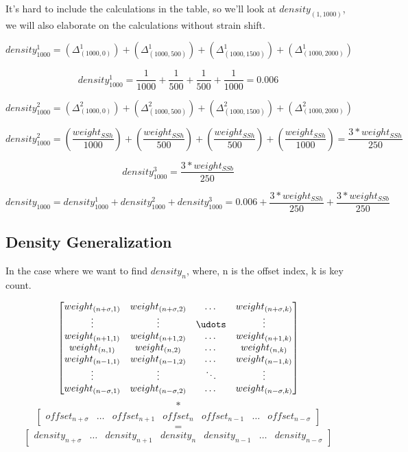 It's hard to include the calculations in the table, so we'll look at $density_{(1,1000)}$, we will also elaborate on the calculations without strain shift.

$$density_{1000}^1 =
(\Delta_{(1000,0)}^{1}) +
(\Delta_{(1000,500)}^{1}) +
(\Delta_{(1000,1500)}^{1}) +
(\Delta_{(1000,2000)}^{1})$$

$$density_{1000}^1 =
\frac{1}{1000} +
\frac{1}{500} +
\frac{1}{500} +
\frac{1}{1000} = 0.006$$

$$density_{1000}^2 = 
(\Delta_{(1000,0)}^{2}) +
(\Delta_{(1000,500)}^{2}) +
(\Delta_{(1000,1500)}^{2}) +
(\Delta_{(1000,2000)}^{2})$$

$$ density_{1000}^2 = 
(\frac{weight_{SSh}}{1000}) +
(\frac{weight_{SSh}}{500}) +
(\frac{weight_{SSh}}{500}) +
(\frac{weight_{SSh}}{1000}) =
\frac{3 * weight_{SSh}}{250} $$

$$ density_{1000}^3 =
\frac{3 * weight_{SSb}}{250} $$

$$ density_{1000} =
density_{1000}^1 + density_{1000}^2 + density_{1000}^3 =
0.006 +
\frac{3 * weight_{SSh}}{250} + \frac{3 * weight_{SSb}}{250} $$

\subsection{Density Generalization}

In the case where we want to find $density_n$, where, n is the offset index, k is key count.

\[ 	
\begin{bmatrix}
	weight_{(n+\sigma,1)} & weight_{(n+\sigma,2)} & \dots  & weight_{(n+\sigma,k)} \\
	\vdots & \vdots & \udots & \vdots \\
	weight_{(n+1,1)} & weight_{(n+1,2)} & \dots  & weight_{(n+1,k)} \\
	weight_{(n,1)} & weight_{(n,2)} & \dots  & weight_{(n,k)} \\
    weight_{(n-1,1)} & weight_{(n-1,2)} & \dots  & weight_{(n-1,k)} \\
    \vdots & \vdots & \ddots & \vdots \\
    weight_{(n-\sigma,1)} & weight_{(n-\sigma,2)} & \dots  & weight_{(n-\sigma,k)}
\end{bmatrix}
\]
$$ * $$
\[
\begin{bmatrix}
	offset_{n+\sigma} & \dots & offset_{n+1} & offset_{n} & offset_{n-1} & \dots & offset_{n-\sigma} 
\end{bmatrix}
\]
$$ = $$
\[
\begin{bmatrix}
	density_{n+\sigma} & \dots & density_{n+1} & density_{n} & density_{n-1} & \dots & density_{n-\sigma} 
\end{bmatrix}
\]

